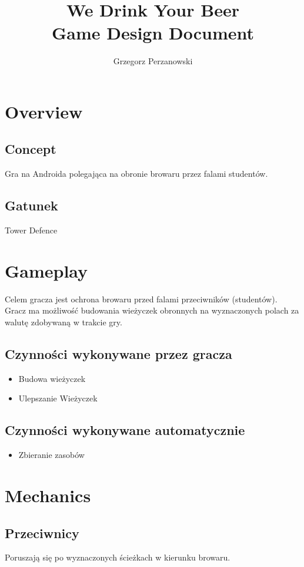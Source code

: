 \documentclass[12pt]{article}
\title{%
	We Drink Your Beer\\
	\large Game Design Document}
\author{Grzegorz Perzanowski}
\begin{document}
	\maketitle
	\newpage
	\tableofcontents
	\newpage
	
\section{Overview}
\subsection{Concept}
	Gra na Androida polegająca na obronie browaru przez falami studentów.
\subsection{Gatunek}
	Tower Defence 
	
\newpage
\section{Gameplay}
	Celem gracza jest ochrona browaru przed falami przeciwników (studentów). Gracz ma możliwość
	budowania wieżyczek obronnych na wyznaczonych polach za walutę zdobywaną w trakcie gry.
\subsection{Czynności wykonywane przez gracza}
\begin{itemize}
	\item Budowa wieżyczek
	\item Ulepszanie Wieżyczek
\end{itemize}
\subsection{Czynności wykonywane automatycznie}
\begin{itemize}
	\item Zbieranie zasobów
\end{itemize}
	
\newpage
\section{Mechanics}
\subsection{Przeciwnicy}
	Poruszają się po wyznaczonych ścieżkach w kierunku browaru.
\end{document}
